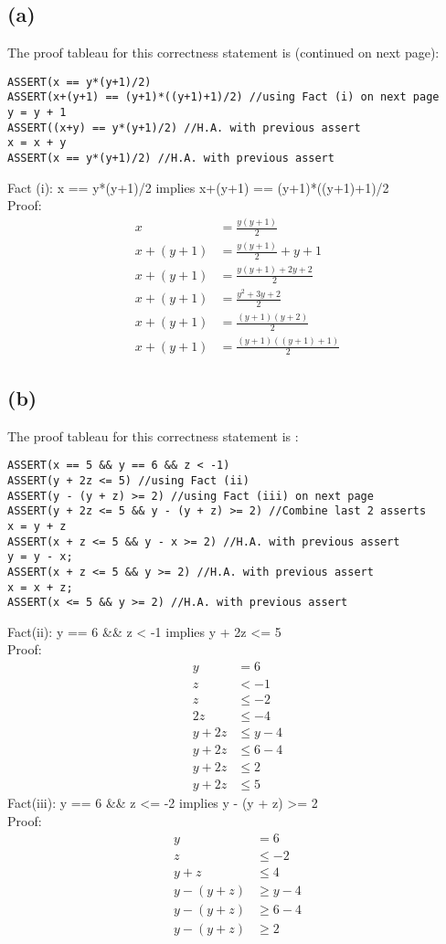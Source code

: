 \documentclass{article}
\begin{document}
	\subsection*{(a)} The proof tableau for this correctness statement is (continued on next page):
	{\selectfont
	\begin{lstlisting}
ASSERT(x == y*(y+1)/2)
ASSERT(x+(y+1) == (y+1)*((y+1)+1)/2) //using Fact (i) on next page
y = y + 1
ASSERT((x+y) == y*(y+1)/2) //H.A. with previous assert
x = x + y
ASSERT(x == y*(y+1)/2) //H.A. with previous assert
	\end{lstlisting}
	}
	Fact (i): {\selectfont x == y*(y+1)/2 implies x+(y+1) == (y+1)*((y+1)+1)/2}
	\\Proof:
		\begin{align*}
			x &= \frac{y(y+1)}{2}\\
			x + (y + 1) &= \frac{y(y+1)}{2} + y + 1\\
			x + (y + 1) &= \frac{y(y+1)+2y+2}{2}\\
			x + (y + 1) &= \frac{y^2 + 3y+2}{2}\\
			x + (y + 1) &= \frac{(y+1)(y+2)}{2}\\
			x + (y + 1) &= \frac{(y+1)((y+1)+1)}{2}	
		\end{align*}
	\subsection*{(b)} The proof tableau for this correctness statement is :
	{\selectfont
	\begin{lstlisting}
ASSERT(x == 5 && y == 6 && z < -1)
ASSERT(y + 2z <= 5) //using Fact (ii)
ASSERT(y - (y + z) >= 2) //using Fact (iii) on next page
ASSERT(y + 2z <= 5 && y - (y + z) >= 2) //Combine last 2 asserts
x = y + z
ASSERT(x + z <= 5 && y - x >= 2) //H.A. with previous assert
y = y - x;
ASSERT(x + z <= 5 && y >= 2) //H.A. with previous assert
x = x + z;
ASSERT(x <= 5 && y >= 2) //H.A. with previous assert
	\end{lstlisting}
	}
	Fact(ii): {\selectfont y == 6 \&\& z < -1 implies y + 2z <= 5}
\\Proof:
	\begin{align*}
		y &= 6\\
		z &< -1\\
		z &\leq -2\\
		2z &\leq -4\\
		y + 2z &\leq y - 4\\
		y + 2z &\leq 6 - 4\\
		y + 2z &\leq 2\\
		y + 2z &\leq 5
	\end{align*}
	Fact(iii): {\selectfont y == 6 \&\& z <= -2 implies y - (y + z) >= 2}
\\Proof:
	\begin{align*}
		y &= 6\\
		z &\leq -2\\
		y + z &\leq 4\\
		y - (y + z) &\geq y- 4\\
		y - (y + z) &\geq 6 - 4\\
		y - (y + z) &\geq 2
	\end{align*}
\end{document}
